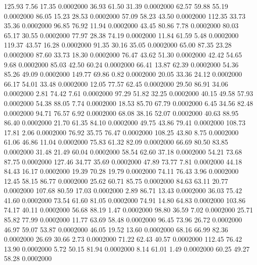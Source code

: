  125.93    7.56   17.35   0.0002000
  36.93   61.50   31.39   0.0002000
  62.57   59.88   55.19   0.0002000
  86.05   15.23   28.53   0.0002000
  57.09   58.23   43.50   0.0002000
 112.35   33.73   35.36   0.0002000
  96.85   76.92   11.94   0.0002000
  43.45   80.86    7.78   0.0002000
  80.03   65.17   30.55   0.0002000
  77.97   28.38   74.19   0.0002000
  11.84   61.59    5.48   0.0002000
 119.37   43.57   16.28   0.0002000
  91.35   30.16   35.05   0.0002000
  65.00   87.35   23.28   0.0002000
  87.60   33.73   18.30   0.0002000
  76.47   43.62   51.30   0.0002000
  42.42   54.65    9.68   0.0002000
  85.03   42.50   60.24   0.0002000
  66.41   13.87   62.39   0.0002000
  54.36   85.26   49.09   0.0002000
 149.77   69.86    0.82   0.0002000
  20.05   33.36   24.12   0.0002000
  66.17   54.01   33.48   0.0002000
  12.05   77.57   62.45   0.0002000
  29.50   86.91   34.06   0.0002000
   2.81   74.42    7.61   0.0002000
  97.29   51.82   32.25   0.0002000
  40.15   49.58   57.93   0.0002000
  54.38   88.05    7.74   0.0002000
  18.53   85.70   67.79   0.0002000
   6.45   34.56   82.48   0.0002000
  94.71   76.57    6.92   0.0002000
  68.08   38.16   52.07   0.0002000
  40.63   88.95   86.40   0.0002000
  21.70   61.35   84.10   0.0002000
  49.75   43.86   79.41   0.0002000
 108.73   17.81    2.06   0.0002000
  76.92   35.75   76.47   0.0002000
 108.25   43.80    8.75   0.0002000
  61.06   46.86   11.04   0.0002000
  75.83   61.32   82.09   0.0002000
  66.69   80.50   83.85   0.0002000
  31.48   21.49   60.04   0.0002000
  58.54   62.60   37.18   0.0002000
  54.21   73.68   87.75   0.0002000
 127.46   34.77   35.69   0.0002000
  47.89   73.77    7.81   0.0002000
  44.18   84.43   16.17   0.0002000
  19.39   70.28   19.79   0.0002000
  74.11   76.43    3.96   0.0002000
  12.45   58.15   86.77   0.0002000
  25.62   60.71   85.75   0.0002000
  84.63   63.11   20.77   0.0002000
 107.68   80.59   17.03   0.0002000
   2.89   86.71   13.43   0.0002000
  36.03   75.42   41.60   0.0002000
  73.54   61.60   81.05   0.0002000
  74.91   14.80   64.83   0.0002000
 103.86   74.17   40.11   0.0002000
  56.68   88.19    1.47   0.0002000
  98.80   36.59    7.02   0.0002000
  25.71   85.82   77.99   0.0002000
  11.77   63.69   58.48   0.0002000
  96.45   73.96   26.72   0.0002000
  46.97   59.07   53.87   0.0002000
  46.05   19.52   13.60   0.0002000
  68.16   66.99   82.36   0.0002000
  26.69   30.66    2.73   0.0002000
  71.22   62.43   40.57   0.0002000
 112.45   76.42   13.90   0.0002000
   5.72   50.15   81.94   0.0002000
   8.14   61.01    1.49   0.0002000
  60.25   49.27   58.28   0.0002000
